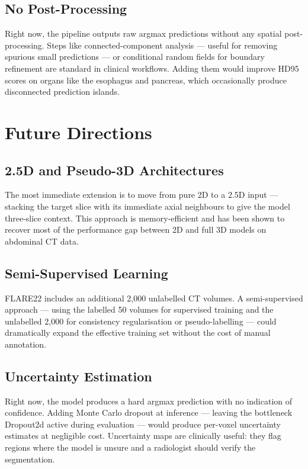 \subsection{No Post-Processing}

Right now, the pipeline outputs raw argmax predictions without any spatial post-processing. Steps like connected-component analysis --- useful for removing spurious small predictions --- or conditional random fields for boundary refinement are standard in clinical workflows. Adding them would improve HD95 scores on organs like the esophagus and pancreas, which occasionally produce disconnected prediction islands.

\section{Future Directions}

\subsection{2.5D and Pseudo-3D Architectures}

The most immediate extension is to move from pure 2D to a 2.5D input --- stacking the target slice with its immediate axial neighbours to give the model three-slice context. This approach is memory-efficient and has been shown to recover most of the performance gap between 2D and full 3D models on abdominal CT data.

\subsection{Semi-Supervised Learning}

FLARE22 includes an additional 2{,}000 unlabelled CT volumes. A semi-supervised approach --- using the labelled 50 volumes for supervised training and the unlabelled 2{,}000 for consistency regularisation or pseudo-labelling --- could dramatically expand the effective training set without the cost of manual annotation.

\subsection{Uncertainty Estimation}

Right now, the model produces a hard argmax prediction with no indication of confidence. Adding Monte Carlo dropout at inference --- leaving the bottleneck Dropout2d active during evaluation --- would produce per-voxel uncertainty estimates at negligible cost. Uncertainty maps are clinically useful: they flag regions where the model is unsure and a radiologist should verify the segmentation.

